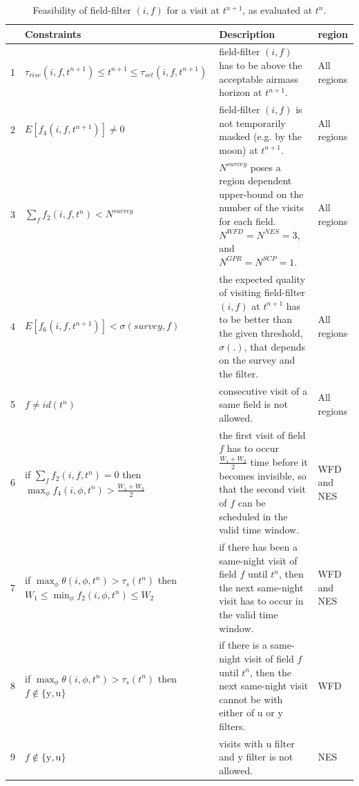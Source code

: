 \documentclass[12pt]{aastex62}
\theoremstyle{definition}
\begin{document}
\begin{table}
\caption{Feasibility of field-filter $(i,f)$ for a visit at $t^{n+1}$, as evaluated at $t^n$.}
\begin{tabularx}{\textwidth}{| l | X | X | l |}
\hline
& Constraints& Description & region\\ \hline \hline

1&$ \tau_{rise}(i,f,t^{n+1}) \leq t^{n+1} \leq \tau_{set}(i,f,t^{n+1}) $ & field-filter $(i,f)$ has to be above the acceptable airmass horizon at $t^{n+1}.$ & All regions\\ \hline

2&$ E[f_4(i,f,t^{n+1})] \neq 0 $ & field-filter $(i,f)$ is not temporarily masked (e.g. by the moon) at $t^{n+1}$. & All regions\\ \hline

3 & $\sum_{f}f_2(i,f,t^n) < N^{\textit{survey}}$ & $N^{\textit{survey}}$ poses a region dependent upper-bound on the number of the visits for each field. $N^{WFD}= N^{NES} = 3$, and $N^{GPR}= N^{SCP} = 1.$ & All regions\\ \hline

4 & $E[f_6(i,f,t^{n+1})] < \sigma({\textit{survey},f})$ & the expected quality of visiting field-filter $(i,f)$ at $t^{n+1}$ has to be better than the given threshold, $\sigma(.)$, that depends on the survey and the filter. & All regions\\ \hline

5&$f \neq id(t^n)$ & consecutive visit of a same field is not allowed. & All regions\\ \hline

6& if $\sum_{f}f_2(i,f,t^n) = 0$ then \newline $\max_\phi f_4(i,\phi,t^n) > \frac{W_1+W_2}{2}$ & the first visit of field $f$ has to occur $\frac{W_1+W_2}{2}$ time before it becomes invisible, so that the second visit of $f$ can be scheduled in the valid time window. & WFD and NES\\ \hline

7& if $\max_{\phi}\theta(i,\phi,t^n) > \tau_s(t^n)$ then \newline $ W_1 \leq \min_{\phi}f_2(i,\phi,t^n) \leq W_2 $& if there has been a same-night visit of field $f$ until $t^n$, then the next same-night visit has to occur in the valid time window. & WFD and NES\\ \hline

8&if \newline $\max_{\phi}\theta(i,\phi,t^n) > \tau_s(t^n)$ then \newline $f \notin \{\text{y},\text{u}\}$& if there is a same-night visit of field $f$ until $t^n$, then the next same-night visit cannot be with either of u or y filters. & WFD\\ \hline

9& $f \notin \{\text{y},\text{u}\}$ & visits with u filter and y filter is not allowed. & NES\\ \hline

\end{tabularx}
\end{table}\label{tab_feasibility}
\end{document}
